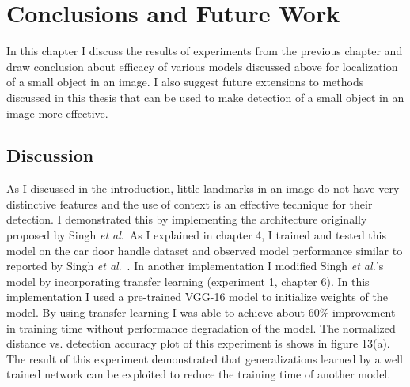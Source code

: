 \documentclass [11pt,letterpaper ,openany ]{report}
\begin{document}
    \chapter{Conclusions and Future Work}
    \doublespacing

    In this chapter I discuss the results of experiments from the previous chapter and draw conclusion about efficacy of various models discussed above for localization of a small object in an image. I also suggest future extensions to methods discussed in this thesis that can be used to make detection of a small object in an image more effective.

    \section{Discussion}

    As I discussed in the introduction, little landmarks in an image do not have very distinctive features and the use of context is an effective technique for their detection. I demonstrated this by implementing the architecture originally proposed by Singh \textit{et al}.\ As I explained in chapter 4, I trained and tested this model on the car door handle dataset and observed model performance similar to reported by Singh \textit{et al}.\ \cite{Singh_2016_CVPR}. In another implementation I modified Singh \textit{et al.}'s model \cite{Singh_2016_CVPR} by incorporating transfer learning (experiment 1, chapter 6). In this implementation I used a pre-trained VGG-16 model \cite{simonyan2014very} to initialize weights of the model. By using transfer learning I was able to achieve about 60\% improvement in training time without performance degradation of the model. The normalized distance vs. detection accuracy plot of this experiment is shows in figure 13(a). The result of this experiment demonstrated that generalizations learned by a well trained network can be exploited to reduce the training time of another model.
\end{document}
